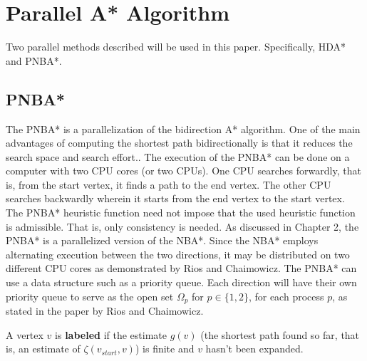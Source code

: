 
\section{Parallel A* Algorithm}
Two parallel methods described will be used in this paper. Specifically, HDA* and PNBA*.\cite{Kishimoto2009,Rios2011}

\subsection{PNBA*}
The PNBA* is a parallelization of the bidirection A* algorithm. One of the main advantages of computing the shortest path 
bidirectionally is that it reduces the search space and search effort.\cite{KainlKainz1997,Pijls2009}. The execution of the PNBA*
can be done on a computer with two CPU cores (or two CPUs). One CPU searches forwardly, that is, from the start vertex, it finds a 
path to the end vertex. The other CPU searches backwardly wherein it starts from the end vertex to the start vertex. The PNBA* heuristic function 
need not impose that the used heuristic function is admissible. That is, only consistency is needed. As discussed in Chapter 2, the PNBA* is a 
parallelized version of the NBA*. Since the NBA* employs alternating execution between the two directions, it may be distributed on two different 
CPU cores as demonstrated by Rios and Chaimowicz. The PNBA* can use a data structure such as a priority queue. Each direction will have their own 
priority queue to serve as the open set $\Omega_p$ for $p\in\{1,2\}$, for each process $p$, as stated in the paper by Rios and Chaimowicz.

\begin{definition}
    A vertex $v$ is \textbf{labeled} if the estimate $g(v)$ (the shortest path found so far, that is, an estimate of $\zeta(v_{start}, v)$)
    is finite and $v$ hasn't been expanded.
\end{definition}

